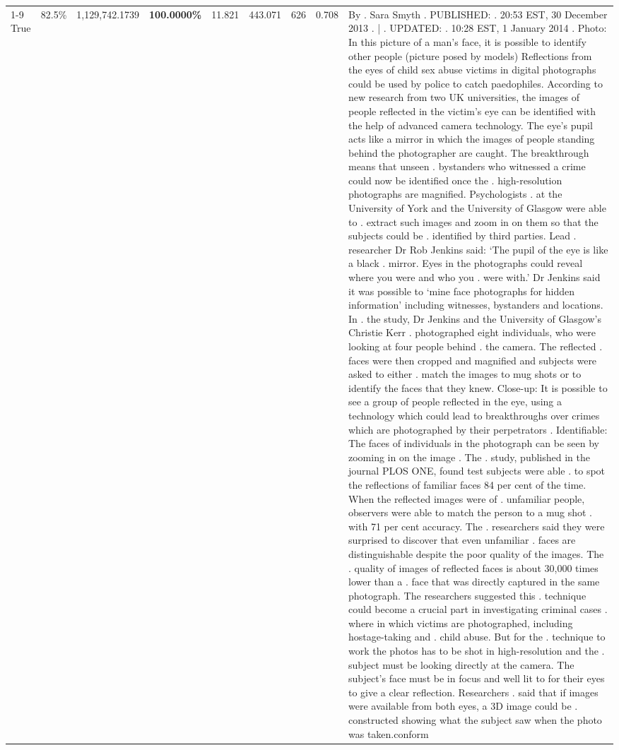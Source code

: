 \begin{table}[H]
\begin{tabular}{lllrlllll}
\cline{1-9}
True & 82.5\% & 1,129,742.1739 & \bfseries \color{red} 100.0000\% & 11.821 & 443.071 & 626 & 0.708 & By . Sara Smyth . PUBLISHED: . 20:53 EST, 30 December 2013 . | . UPDATED: . 10:28 EST, 1 January 2014 . Photo: In this picture of a man's face, it is possible to identify other people (picture posed by models) Reflections from the eyes of child sex abuse victims in digital photographs could be used by police to catch paedophiles. According to new research from two UK universities, the images of people reflected in the victim's eye can be identified with the help of advanced camera technology. The eye's pupil acts like a mirror in which the images of people standing behind the photographer are caught. The breakthrough means that unseen . bystanders who witnessed a crime could now be identified once the . high-resolution photographs are magnified. Psychologists . at the University of York and the University of Glasgow were able to . extract such images and zoom in on them so that the subjects could be . identified by third parties. Lead . researcher Dr Rob Jenkins said: ‘The pupil of the eye is like a black . mirror. Eyes in the photographs could reveal where you were and who you . were with.' Dr Jenkins said it was possible to ‘mine face photographs for hidden information' including witnesses, bystanders and locations. In . the study, Dr Jenkins and the University of Glasgow's Christie Kerr . photographed eight individuals, who were looking at four people behind . the camera. The reflected . faces were then cropped and magnified and subjects were asked to either . match the images to mug shots or to identify the faces that they knew. Close-up: It is possible to see a group of people reflected in the eye, using a technology which could lead to breakthroughs over crimes which are photographed by their perpetrators . Identifiable: The faces of individuals in the photograph can be seen by zooming in on the image . The . study, published in the journal PLOS ONE, found test subjects were able . to spot the reflections of familiar faces 84 per cent of the time. When the reflected images were of . unfamiliar people, observers were able to match the person to a mug shot . with 71 per cent accuracy. The . researchers said they were surprised to discover that even unfamiliar . faces are distinguishable despite the poor quality of the images. The . quality of images of reflected faces is about 30,000 times lower than a . face that was directly captured in the same photograph. The researchers suggested this . technique could become a crucial part in investigating criminal cases . where in which victims are photographed, including hostage-taking and . child abuse. But for the . technique to work the photos has to be shot in high-resolution and the . subject must be looking directly at the camera. The subject's face must be in focus and well lit to for their eyes to give a clear reflection. Researchers . said that if images were available from both eyes, a 3D image could be . constructed showing what the subject saw when the photo was taken.conform \\

\end{tabular}
\end{table}
